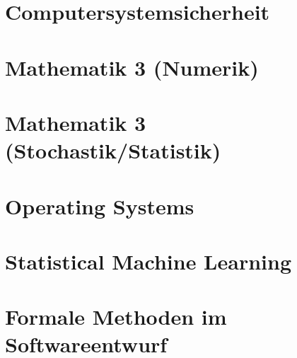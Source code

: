 \documentclass[english, notodo]{fdsummary}
\subtitle{Bachelor of Science (Part 2)}
\newcommand{\lstbasepath}{unset}
\begin{document}
	\maketitle
	\tableofcontents
	
	\cleardoublepage
	\part{Computersystemsicherheit}
	\graphicspath{{./cs/mandatory/fs3/css-fischlin/}}
	\renewcommand{\lstbasepath}{./cs/mandatory/fs3/css-fischlin}
	
	
	\cleardoublepage
	\part{Mathematik 3 (Numerik)}
	\graphicspath{{./cs/mandatory/fs4/mathe3-numerik/}}
	\renewcommand{\lstbasepath}{./cs/mandatory/fs4/mathe3-numerik}
	
	\cleardoublepage
	\part{Mathematik 3 (Stochastik/Statistik)}
	\graphicspath{{./cs/mandatory/fs4/mathe3-stochastik/}}
	\renewcommand{\lstbasepath}{./cs/mandatory/fs4/mathe3-stochastik}
	
	
	\cleardoublepage
	\part{Operating Systems}
	\graphicspath{{./cs/mandatory/fs5/os/}}
	\renewcommand{\lstbasepath}{./cs/mandatory/fs5/os}
	
	
	\cleardoublepage
	\part{Statistical Machine Learning}
	\graphicspath{{./cs/elective/vc/statml/}}
	\renewcommand{\lstbasepath}{./cs/elective/vc/statml}
	
	
	\cleardoublepage
	\part{Formale Methoden im Softwareentwurf}
	\graphicspath{{./cs/mandatory/fs4/fmse/}}
	\renewcommand{\lstbasepath}{./cs/mandatory/fs4/fmse}
	
	
\end{document}

